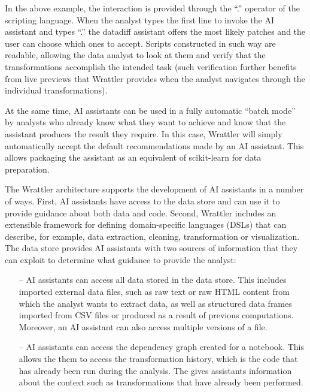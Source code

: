 \documentclass[sigplan,preprint,10pt]{acmart}\settopmatter{printfolios=true,printccs=false,printacmref=false}
\theoremstyle{plain}
\theoremstyle{definition}
\begin{document}
{In the above example, the interaction is provided through the ``.'' operator of the scripting
language. When the analyst types the first line to invoke the AI assistant and types ``.''
the datadiff assistant offers the most likely patches and the user can choose which ones
to accept. Scripts constructed in such way are readable, allowing the data analyst to look at them
and verify that the transformations accomplish the intended task (such verification further
benefits from live previews that Wrattler provides when the analyst navigates through the
individual transformations).

At the same time, AI assistants can be used in a fully automatic ``batch mode'' by analysts
who already know what they want to achieve and know that the assistant produces the result they
require. In this case, Wrattler will simply automatically accept the default recommendations made
by an AI assistant. This allows packaging the assistant as an equivalent of scikit-learn for
data preparation.

\vspace{1em}
The Wrattler architecture supports the development of AI assistants in a number of ways. First, AI
assistants have access to the data store and can use it to provide guidance about both data and
code. Second, Wrattler includes an extensible framework for defining domain-specific languages
(DSLs) that can describe, for example, data extraction, cleaning, transformation or visualization.
The data store provides AI assistants with
two sources of information that they can exploit
to determine what guidance to provide the analyst:
%
\begin{itemize}
\item[--] AI assistants can access all data stored in the data
store. This includes imported external data files, such as raw text or raw HTML content from which
the analyst wants to extract data, as well as structured data frames imported from CSV files or
produced as a result of previous computations. Moreover, an AI assistant can also access multiple
versions of a file.

\item[--] AI assistants can access the dependency graph created for a
notebook. This allows the them to access the transformation history, which is the code
that has already been run during the analysis. The gives assistants information about the
context such as transformations that have already been performed.
\end{itemize}

}
\end{document}
